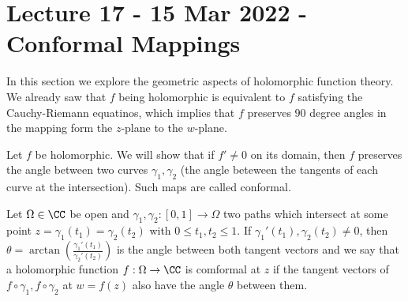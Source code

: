 \section{Lecture 17 - 15 Mar 2022 - Conformal Mappings}
In this section we explore the geometric aspects of holomorphic function theory.
We already saw that $f$ being holomorphic is equivalent to $f$ satisfying the
Cauchy-Riemann equatinos, which implies that $f$ preserves $90$ degree angles in
the mapping form the $z$-plane to the $w$-plane.

Let $f$ be holomorphic. We will show that if $f'\neq 0$ on its domain, then $f$
preserves the angle between two curves $\gamma_1, \gamma_2$ (the angle beteween
the tangents of each curve at the intersection). Such maps are called conformal. 
\begin{definition}
  Let $\Omega\in\CC$ be open and $\gamma_1,\gamma_2:[0,1]\to\Omega$ two paths
  which intersect at some point $z=\gamma_1(t_1)=\gamma_2(t_2)$ with $0\leq
  t_1,t_2\leq 1$. If $\gamma_1'(t_1), \gamma_2(t_2)\neq 0$, then $\theta=
  \arctan \left( \frac{\gamma_1'(t_1)}{\gamma_2'(t_2)} \right)$ is the angle
  between both tangent vectors and we say that a holomorphic function
  $f:\Omega\to\CC$ is comformal at $z$ if the tangent vectors of $f\circ
  \gamma_1, f\circ \gamma_2$ at $w=f(z)$ also have the angle $\theta$ between
  them.
  \label{<+label+>}
\end{definition}


